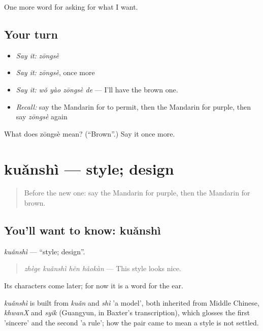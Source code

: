 \begin{grammarlens}[title={What you've built}]
One more word for asking for what I want.
\end{grammarlens}

\subsection*{Your turn}
\begin{itemize}
\raggedright
  \item \emph{Say it:} \emph{zōngsè}
  \item \emph{Say it:} \emph{zōngsè}, once more
  \item \emph{Say it:} \emph{wǒ yào zōngsè de} — I'll have the brown one.
  \item \emph{Recall:} say the Mandarin for to permit, then the Mandarin for purple, then say \emph{zōngsè} again
\end{itemize}

\begin{tcolorbox}[breakable,colback=teal!4,colframe=teal!35!black,title={Before you move on}]
What does zōngsè mean? (\textquotedblleft{}Brown\textquotedblright{}.) Say it once more.
\end{tcolorbox}
\section[kuǎnshì]{kuǎnshì — style; design}

\label{lesson:ZH-C210-kuanshi}



\begin{quote}
Before the new one: say the Mandarin for purple, then the Mandarin for brown.
\end{quote}

\subsection*{You'll want to know: kuǎnshì}
\emph{kuǎnshì} — \textquotedblleft{}style; design\textquotedblright{}.

\begin{quote}
\emph{zhège kuǎnshì hěn hǎokàn} — This style looks nice.
\end{quote}

Its characters come later; for now it is a word for the ear.

\begin{cousinweb}
\emph{kuǎnshì} is built from \emph{kuǎn} and \emph{shì} 'a model', both inherited from Middle Chinese, \emph{khwanX} and \emph{syik} (Guangyun, in Baxter's transcription), which glosses the first 'sincere' and the second 'a rule'; how the pair came to mean a style is not settled.
\end{cousinweb}

